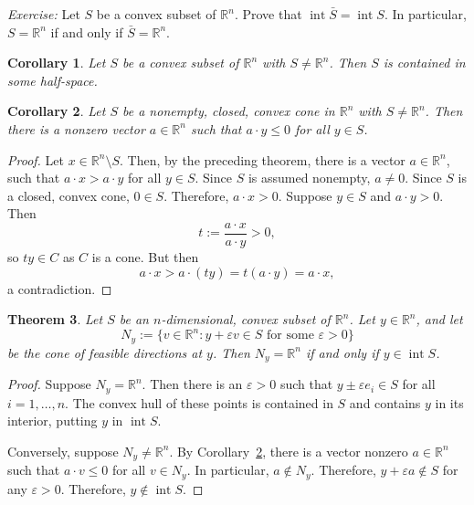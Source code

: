 \documentclass[12pt]{amsart}
\newtheorem{theorem}{Theorem}[section]
\newtheorem{corollary}[theorem]{Corollary}
\theoremstyle{definition}
\theoremstyle{remark}
\numberwithin{equation}{section}
\renewcommand{\epsilon}{\varepsilon}
\newcommand{\RR}{\mathbb{R}}
\DeclareMathOperator{\interior}{int}
\begin{document}
\textit{Exercise:}
Let $S$ be a convex subset of $\RR^n$.
Prove that $\interior \bar{S}=\interior S$.
In particular, $S=\RR^n$ if and only if $\bar{S}=\RR^n$.

\begin{corollary}
    Let $S$ be a convex subset of $\RR^n$ with $S\neq \RR^n$.
    Then $S$ is contained in some half-space.
\end{corollary}

\begin{corollary}\label{corollary: cone in half plane}
    Let $S$ be a nonempty, closed, convex cone in $\RR^n$ with $S\neq\RR^n$.
    Then there is a nonzero vector $a\in\RR^n$ such that $a\cdot y\leq 0$
    for all $y\in S$.
\end{corollary}

\begin{proof}
    Let $x\in\RR^n\setminus S$.
    Then, by the preceding theorem, there is a vector $a\in\RR^n$, such that
    $a\cdot x > a\cdot y$ for all $y\in S$.
    Since $S$ is assumed nonempty, $a\neq 0$.
    Since $S$ is a closed, convex cone, $0\in S$. Therefore, $a\cdot x > 0$.
    Suppose $y\in S$ and $a\cdot y > 0$. Then
    \[
        t:=\frac{a\cdot x}{a\cdot y} > 0,
    \]
    so $ty\in C$ as $C$ is a cone.
    But then
    \[
        a\cdot x > a\cdot (ty) = t(a\cdot y) = a\cdot x,
    \]
    a contradiction.
\end{proof}

\begin{theorem}
    Let $S$ be an $n$-dimensional, convex subset of $\RR^n$.
    Let $y\in \RR^n$, and let
    \[
        N_y := \{v\in\RR^n :
        \text{$y + \epsilon v\in S$ for some $\epsilon > 0$}\}
    \]
    be the cone of feasible directions at $y$.
    Then $N_y=\RR^n$ if and only if $y\in \interior S$.
\end{theorem}

\begin{proof}
    Suppose $N_y=\RR^n$.
    Then there is an $\epsilon > 0$ such that
    $y\pm \epsilon e_i\in S$ for all $i=1,\ldots,n$.
    The convex hull of these points is contained in $S$ and contains $y$ 
    in its interior, putting $y$ in $\interior S$.

    Conversely, suppose $N_y\neq \RR^n$.
    By Corollary~\ref{corollary: cone in half plane},
    there is a vector nonzero $a\in\RR^n$ such that
    $a\cdot v\leq 0$ for all $v\in N_y$.
    In particular, $a\notin N_y$.
    Therefore, $y + \epsilon a\notin S$ for any $\epsilon > 0$.
    Therefore, $y\notin \interior S$.
\end{proof}
\end{document}
